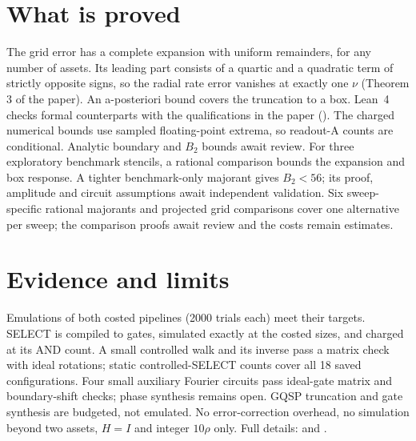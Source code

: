 \documentclass[11pt,a4paper]{article}
\begin{document}
\section*{What is proved}

The grid error has a complete expansion with uniform remainders, for any number of assets. Its leading
part consists of a quartic and a quadratic term of strictly opposite signs, so the
radial rate error vanishes at exactly one $\nu$ (Theorem 3 of the paper). An a-posteriori bound covers the truncation to
a box. Lean~4 checks formal counterparts with the qualifications in the paper
(). The charged numerical bounds use sampled floating-point
extrema, so readout-A counts are conditional. Analytic boundary and $B_2$
bounds await review. For three exploratory benchmark stencils, a rational
comparison bounds the expansion and box response. A tighter benchmark-only
majorant gives $B_2<56$; its proof, amplitude and circuit assumptions await
independent validation. Six sweep-specific rational
majorants and projected grid comparisons cover one alternative per sweep;
the comparison proofs await review and the costs remain estimates.

\section*{Evidence and limits}

Emulations of both costed pipelines (2000 trials each) meet their targets.
SELECT is compiled to gates, simulated exactly at the costed sizes, and charged at its AND count.
A small controlled walk and its inverse pass a matrix check with ideal rotations; static controlled-SELECT counts cover all 18 saved configurations.
Four small auxiliary Fourier circuits pass ideal-gate matrix and boundary-shift checks; phase synthesis remains open.
GQSP truncation and gate synthesis are budgeted, not emulated. No
error-correction overhead, no simulation beyond two assets, $H=I$ and integer
$10\rho$ only. Full details:  and .
\end{document}
